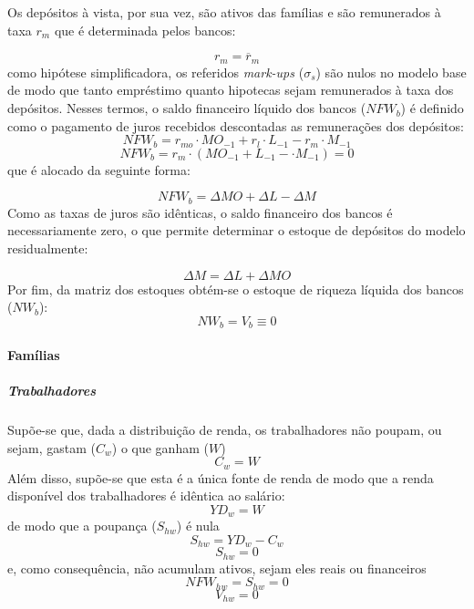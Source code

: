 Os depósitos à vista, por sua vez, são ativos das famílias e são remunerados à taxa $r_m$ que é determinada pelos bancos:

\begin{equation}
    r_m = \overline r_m
\end{equation}
como hipótese simplificadora, os referidos \textit{mark-ups} ($\sigma_s$) são nulos no modelo base de modo que tanto empréstimo quanto hipotecas sejam remunerados à taxa dos depósitos. Nesses termos, o saldo financeiro líquido dos bancos ($NFW_b$) é definido como o pagamento de juros recebidos descontadas as remunerações dos depósitos:
\begin{equation}
    NFW_b = r_{mo}\cdot MO_{-1} + r_l\cdot L_{-1} - r_m\cdot M_{-1}
\end{equation}
$$
    NFW_b = r_{m}\cdot (MO_{-1} + L_{-1} - \cdot M_{-1}) = 0
$$
que é alocado da seguinte forma:

$$
NFW_b = \Delta MO + \Delta L - \Delta M
$$
Como as taxas de juros são idênticas, o saldo financeiro dos bancos é necessariamente zero, o que permite determinar o estoque de depósitos do modelo residualmente:

\begin{equation}
\label{_M}
    \Delta M = \Delta L + \Delta MO
\end{equation}
Por fim, da matriz dos estoques obtém-se o estoque de riqueza líquida dos bancos ($NW_b$):
\begin{equation}
    NW_b = V_b \equiv 0
\end{equation}

\paragraph*{Famílias} 

\subparagraph*{Trabalhadores}

Supõe-se que, dada a distribuição de renda, os trabalhadores não poupam, ou sejam, gastam ($C_w$) o que ganham ($W$)
\begin{equation}
C_w = W
\end{equation}
Além disso, supõe-se que esta é a única fonte de renda de modo que a renda disponível dos trabalhadores é idêntica ao salário:
\begin{equation}
YD_w = W
\end{equation}
de modo que a poupança ($S_{hw}$) é nula 
\begin{equation}
S_{hw} = YD_w - C_w
\end{equation}
$$
S_{hw} = 0
$$
e, como consequência, não acumulam ativos, sejam eles reais ou financeiros
\begin{equation}
NFW_{hw} = S_{hw} = 0
\end{equation}
\begin{equation}
V_{hw} = 0
\end{equation}

